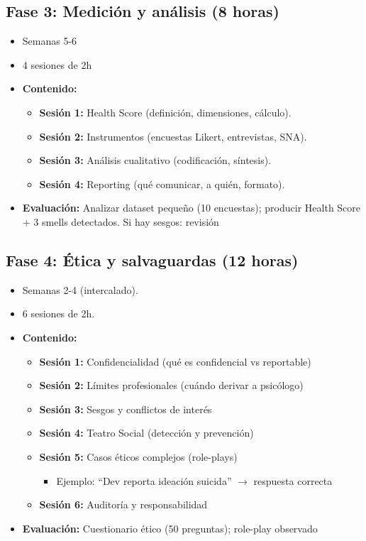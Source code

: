 \subsection*{Fase 3: Medición y análisis (8 horas)}
\begin{itemize}
    \item Semanas 5-6
    \item 4 sesiones de 2h
    \item \textbf{Contenido:}
          \begin{itemize}
              \item \textbf{Sesión 1:} Health Score (definición, dimensiones, cálculo).
              \item \textbf{Sesión 2:} Instrumentos (encuestas Likert, entrevistas, SNA).
              \item \textbf{Sesión 3:} Análisis cualitativo (codificación, síntesis).
              \item \textbf{Sesión 4:} Reporting (qué comunicar, a quién, formato).
          \end{itemize}
    \item \textbf{Evaluación:} Analizar dataset pequeño (10 encuestas); producir Health Score + 3 smells detectados. Si hay sesgos: revisión
\end{itemize}

\subsection*{Fase 4: Ética y salvaguardas (12 horas)}
\begin{itemize}
    \item Semanas 2-4 (intercalado).
    \item 6 sesiones de 2h.
    \item \textbf{Contenido:}
          \begin{itemize}
              \item \textbf{Sesión 1:} Confidencialidad (qué es confidencial vs reportable)
              \item \textbf{Sesión 2:} Límites profesionales (cuándo derivar a psicólogo)
              \item \textbf{Sesión 3:} Sesgos y conflictos de interés
              \item \textbf{Sesión 4:} Teatro Social (detección y prevención)
              \item \textbf{Sesión 5:} Casos éticos complejos (role-plays)
                    \begin{itemize}
                        \item Ejemplo: ``Dev reporta ideación suicida'' $\rightarrow$ respuesta correcta
                    \end{itemize}
              \item \textbf{Sesión 6:} Auditoría y responsabilidad
          \end{itemize}
    \item \textbf{Evaluación:} Cuestionario ético (50 preguntas); role-play observado
\end{itemize}

